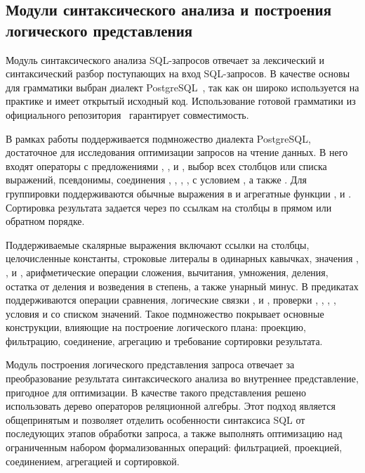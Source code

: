 \documentclass[14pt, russian]{scrartcl}
\begin{document}
\subsection{Модули синтаксического анализа и построения логического представления}

Модуль синтаксического анализа SQL-запросов отвечает за лексический и
синтаксический разбор поступающих на вход SQL-запросов. В качестве основы для
грамматики выбран диалект PostgreSQL~\cite{PostgresDocs}, так как он широко
используется на практике и имеет открытый исходный код. Использование готовой
грамматики из официального репозитория~\cite{PostgresBisonGrammar} гарантирует
совместимость.

В рамках работы поддерживается подмножество диалекта PostgreSQL, достаточное для
исследования оптимизации запросов на чтение данных. В него входят операторы
\SELECT{} с предложениями \FROM, \WHERE, \GROUPBY{} и \ORDERBY{}, выбор всех
столбцов или списка выражений, псевдонимы, соединения \JOIN, ,
, ,  с условием ,
а также . Для группировки поддерживаются обычные выражения в
\GROUPBY{} и агрегатные функции \SUM{}, \COUNT{} и . Сортировка
результата задается через \ORDERBY{} по ссылкам на столбцы в прямом или обратном
порядке.

Поддерживаемые скалярные выражения включают ссылки на столбцы, целочисленные
константы, строковые литералы в одинарных кавычках, значения ,
,  и , арифметические операции сложения,
вычитания, умножения, деления, остатка от деления и возведения в степень, а
также унарный минус. В предикатах поддерживаются операции сравнения, логические
связки ,  и , проверки ,
, , , условия  и
 со списком значений. Такое подмножество покрывает основные
конструкции, влияющие на построение логического плана: проекцию, фильтрацию,
соединение, агрегацию и требование сортировки результата.

Модуль построения логического представления запроса отвечает за преобразование
результата синтаксического анализа во внутреннее представление, пригодное для
оптимизации. В качестве такого представления решено использовать дерево
операторов реляционной алгебры. Этот подход является общепринятым и позволяет
отделить особенности синтаксиса SQL от последующих этапов обработки запроса, а
также выполнять оптимизацию над ограниченным набором формализованных операций:
фильтрацией, проекцией, соединением, агрегацией и сортировкой.
\end{document}

